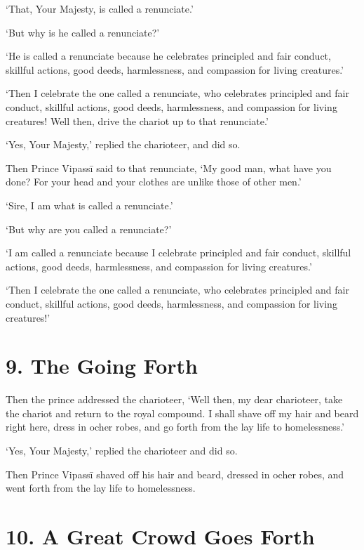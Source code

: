 \documentclass[12pt,openany]{book}%
\begin{document}
‘That, Your Majesty, is called a renunciate.’ 

‘But why is he called a renunciate?’ 

‘He is called a renunciate because he celebrates principled and fair conduct, skillful actions, good deeds, harmlessness, and compassion for living creatures.’ 

‘Then I celebrate the one called a renunciate, who celebrates principled and fair conduct, skillful actions, good deeds, harmlessness, and compassion for living creatures! Well then, drive the chariot up to that renunciate.’ 

‘Yes, Your Majesty,’ replied the charioteer, and did so. 

Then Prince \textsanskrit{Vipassī} said to that renunciate, ‘My good man, what have you done? For your head and your clothes are unlike those of other men.’ 

‘Sire, I am what is called a renunciate.’ 

‘But why are you called a renunciate?’ 

‘I am called a renunciate because I celebrate principled and fair conduct, skillful actions, good deeds, harmlessness, and compassion for living creatures.’ 

‘Then I celebrate the one called a renunciate, who celebrates principled and fair conduct, skillful actions, good deeds, harmlessness, and compassion for living creatures!’ 

\section*{9. The Going Forth }

Then the prince addressed the charioteer, ‘Well then, my dear charioteer, take the chariot and return to the royal compound. I shall shave off my hair and beard right here, dress in ocher robes, and go forth from the lay life to homelessness.’ 

‘Yes, Your Majesty,’ replied the charioteer and did so. 

Then Prince \textsanskrit{Vipassī} shaved off his hair and beard, dressed in ocher robes, and went forth from the lay life to homelessness. 

\section*{10. A Great Crowd Goes Forth }
\end{document}

